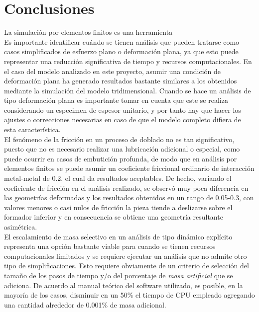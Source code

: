 \chapter*{Conclusiones}


La simulación por elementos finitos es una herramienta \\

Es importante identificar cuándo se tienen análisis que pueden tratarse como casos simplificados 
de esfuerzo plano o deformación plana, ya que esto puede representar una reducción significativa 
de tiempo y recursos computacionales. En el caso del modelo analizado en este proyecto, asumir 
una condición de deformación plana ha generado resultados bastante similares a los obtenidos 
mediante la simulación del modelo tridimensional. Cuando se hace un análisis de tipo 
deformación plana es importante tomar en cuenta que este se realiza considerando un especimen 
de espesor unitario, y por tanto hay que hacer los ajustes o correcciones necesarias en 
caso de que el modelo completo difiera de esta característica. \\

El fenómeno de la fricción en un proceso de doblado no es tan significativo, puesto que no 
es necesario realizar una lubricación adicional o especial, como puede ocurrir en casos 
de embutición profunda, de modo que en análisis por elementos finitos se puede asumir 
un coeficiente friccional ordinario de interacción metal-metal de 0.2, el cual da resultados 
aceptables. De hecho, variando el coeficiente de fricción en el análisis realizado, se observó 
muy poca diferencia en las geometrías deformadas y los resultados obtenidos en un rango de 0.05-0.3, 
con valores menores o casi nulos de fricción la pieza tiende a deslizarse sobre el formador 
inferior y en consecuencia se obtiene una geometría resultante asimétrica.\\

El escalamiento de masa selectivo en un análisis de tipo dinámico explícito representa una 
opción bastante viable para cuando se tienen recursos computacionales limitados y se 
requiere ejecutar un análisis que no admite otro tipo de simplificaciones. Esto requiere 
obviamente de un criterio de selección del tamaño de los pasos de tiempo y/o del porcentaje 
de \textit{masa artificial} que se adiciona. De acuerdo al manual teórico del software 
utilizado, es posible, en la mayoría de los casos, disminuir en un 50\% el tiempo de CPU 
empleado agregando una cantidad alrededor de 0.001\% de masa adicional.\\